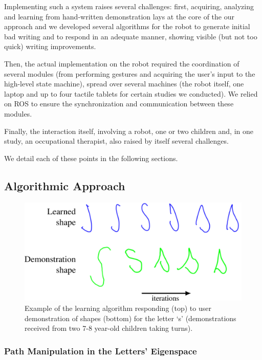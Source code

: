 \documentclass{article}
\begin{document}
Implementing such a system raises several challenges: first, acquiring,
analyzing and learning from hand-written demonstration lays at the core of the
our approach and we developed several algorithms for the robot to generate
initial bad writing and to respond in an adequate manner, showing visible (but
not too quick) writing improvements.

Then, the actual implementation on the robot required the coordination of
several modules (from performing gestures and acquiring the user's input to
the high-level state machine), spread over several machines (the robot itself,
one laptop and up to four tactile tablets for certain studies we conducted). We
relied on ROS to ensure the synchronization and communication between these
modules.

Finally, the interaction itself, involving a robot, one or two children and, in
one study, an occupational therapist, also raised by itself several challenges.

We detail each of these points in the following sections.

\subsection{Algorithmic Approach}

\begin{figure}[thpb]
    \centering
    \includegraphics[width=0.6\columnwidth]{learningSdemo}
    \caption{\label{fig:demonstrationShapes2}Example of the learning algorithm
    responding (top) to user demonstration of shapes (bottom) for the letter `s'
    (demonstrations received from two 7-8 year-old children taking turns).}

\end{figure}


\subsubsection{Path Manipulation in the Letters' Eigenspace}
\end{document}
